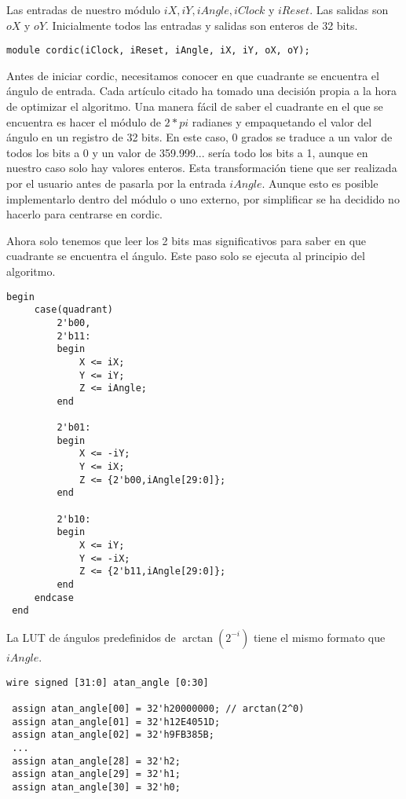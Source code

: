 Las entradas de nuestro módulo $iX, iY, iAngle, iClock$ y $iReset$. Las salidas son $oX$ y $oY$. Inicialmente todos las entradas y salidas son enteros de 32 bits.

\begin{lstlisting}[caption={Módulo \gls{cordic}}]
module cordic(iClock, iReset, iAngle, iX, iY, oX, oY);
\end{lstlisting}

Antes de iniciar \gls{cordic}, necesitamos conocer en que cuadrante se encuentra el ángulo de entrada. Cada artículo citado ha tomado una decisión propia a la hora de optimizar el algoritmo. Una manera fácil de saber el cuadrante en el que se encuentra es hacer el módulo de $2*pi$ radianes y empaquetando el valor del ángulo en un registro de 32 bits. En este caso, 0 grados se traduce a un valor de todos los bits a 0 y un valor de 359.999... sería todo los bits a 1, aunque en nuestro caso solo hay valores enteros. Esta transformación tiene que ser realizada por el usuario antes de pasarla por la entrada $iAngle$. Aunque esto es posible implementarlo dentro del módulo o uno externo, por simplificar se ha decidido no hacerlo para centrarse en \gls{cordic}.

Ahora solo tenemos que leer los 2 bits mas significativos para saber en que cuadrante se encuentra el ángulo. Este paso solo se ejecuta al principio del algoritmo.
\begin{lstlisting}[caption={Pre-rotación de iAngle pasado por el usuario.}]
 begin
     case(quadrant)
         2'b00,
         2'b11: 
         begin
             X <= iX;
             Y <= iY;
             Z <= iAngle;
         end

         2'b01:
         begin
             X <= -iY;
             Y <= iX;
             Z <= {2'b00,iAngle[29:0]};
         end

         2'b10:
         begin
             X <= iY;
             Y <= -iX;
             Z <= {2'b11,iAngle[29:0]};
         end
     endcase
 end

\end{lstlisting}
La LUT de ángulos predefinidos de $\arctan(2^{-i})$ tiene el mismo formato que $iAngle$.
\begin{lstlisting}[caption={Tabla de $\arctan$.}]
wire signed [31:0] atan_angle [0:30]

 assign atan_angle[00] = 32'h20000000; // arctan(2^0)
 assign atan_angle[01] = 32'h12E4051D; 
 assign atan_angle[02] = 32'h9FB385B; 
 ...
 assign atan_angle[28] = 32'h2;
 assign atan_angle[29] = 32'h1;
 assign atan_angle[30] = 32'h0;
\end{lstlisting}

